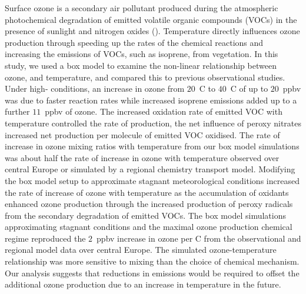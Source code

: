 Surface ozone is a secondary air pollutant produced during the atmospheric photochemical degradation of emitted volatile organic compounds (VOCs) in the presence of sunlight and nitrogen oxides (). 
Temperature directly influences ozone production through speeding up the rates of the chemical reactions and increasing the emissions of VOCs, such as isoprene, from vegetation.
In this study, we used a box model to examine the non-linear relationship between ozone,  and temperature, and compared this to previous observational studies.
Under high- conditions, an increase in ozone from $20$~\degree C to $40$~\degree C of up to $20$~ppbv was due to faster reaction rates while increased isoprene emissions added up to a further $11$~ppbv of ozone.
The increased oxidation rate of emitted VOC with temperature controlled the rate of  production, the net influence of peroxy nitrates increased net  production per molecule of emitted VOC oxidised.
The rate of increase in ozone mixing ratios with temperature from our box model simulations was about half the rate of increase in ozone with temperature observed over central Europe or simulated by a regional chemistry transport model.
Modifying the box model setup to approximate stagnant meteorological conditions increased the rate of increase of ozone with temperature as the accumulation of oxidants enhanced ozone production through the increased production of peroxy radicals from the secondary degradation of emitted VOCs.
The box model simulations approximating stagnant conditions and the maximal ozone production chemical regime reproduced the $2$~ppbv increase in ozone per \degree C from the observational and regional model data over central Europe.
The simulated ozone-temperature relationship was more sensitive to mixing than the choice of chemical mechanism.
Our analysis suggests that reductions in  emissions would be required to offset the additional ozone production due to an increase in temperature in the future.
